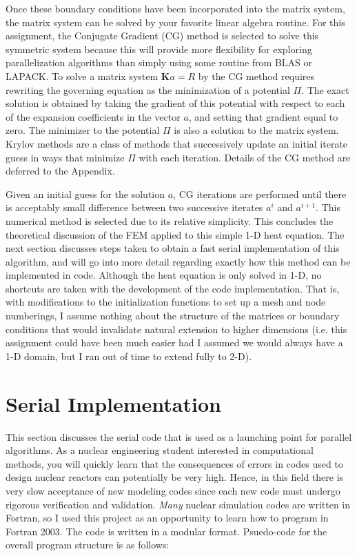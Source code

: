 \documentclass[10pt]{article}
\begin{document}
Once these boundary conditions have been incorporated into the matrix system, the matrix system can be solved by your favorite linear algebra routine. For this assignment, the Conjugate Gradient (CG) method is selected to solve this symmetric system because this will provide more flexibility for exploring parallelization algorithms than simply using some routine from BLAS or LAPACK. To solve a matrix system \(\textbf{K}a=R\) by the CG method requires rewriting the governing equation as the minimization of a potential \(\Pi\). The exact solution is obtained by taking the gradient of this potential with respect to each of the expansion coefficients in the vector \(a\), and setting that gradient equal to zero. The minimizer to the potential \(\Pi\) is also a solution to the matrix system. Krylov methods are a class of methods that successively update an initial iterate guess in ways that minimize \(\Pi\) with each iteration. Details of the CG method are deferred to the Appendix.

Given an initial guess for the solution \(a\), CG iterations are performed until there is acceptably small difference between two successive iterates \(a^i\) and \(a^{i+1}\). This numerical method is selected due to its relative simplicity. This concludes the theoretical discussion of the FEM applied to this simple 1-D heat equation. The next section discusses steps taken to obtain a fast serial implementation of this algorithm, and will go into more detail regarding exactly how this method can be implemented in code. Although the heat equation is only solved in 1-D, no shortcuts are taken with the development of the code implementation. That is, with modifications to the initialization functions to set up a mesh and node numberings, I assume nothing about the structure of the matrices or boundary conditions that would invalidate natural extension to higher dimensions (i.e. this assignment could have been much easier had I assumed we would always have a 1-D domain, but I ran out of time to extend fully to 2-D).

\section{Serial Implementation}

This section discusses the serial code that is used as a launching point for parallel algorithms. As a nuclear engineering student interested in computational methods, you will quickly learn that the consequences of errors in codes used to design nuclear reactors can potentially be very high. Hence, in this field there is very slow acceptance of new modeling codes since each new code must undergo rigorous verification and validation. {\it Many} nuclear simulation codes are written in Fortran, so I used this project as an opportunity to learn how to program in Fortran 2003. The code is written in a modular format. Psuedo-code for the overall program structure is as follows:
\end{document}

